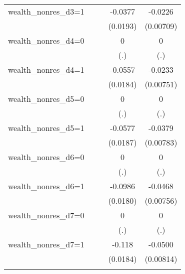 \begin{table}[htbp]
\begin{tabular}{l*{4}{c}}
\addlinespace
wealth\_nonres\_d3=1&                  &                  &  -0.0377\sym{*}  &  -0.0226\sym{***}\\
                &                  &                  & (0.0193)         &(0.00709)         \\
\addlinespace
wealth\_nonres\_d4=0&                  &                  &        0         &        0         \\
                &                  &                  &      (.)         &      (.)         \\
\addlinespace
wealth\_nonres\_d4=1&                  &                  &  -0.0557\sym{***}&  -0.0233\sym{***}\\
                &                  &                  & (0.0184)         &(0.00751)         \\
\addlinespace
wealth\_nonres\_d5=0&                  &                  &        0         &        0         \\
                &                  &                  &      (.)         &      (.)         \\
\addlinespace
wealth\_nonres\_d5=1&                  &                  &  -0.0577\sym{***}&  -0.0379\sym{***}\\
                &                  &                  & (0.0187)         &(0.00783)         \\
\addlinespace
wealth\_nonres\_d6=0&                  &                  &        0         &        0         \\
                &                  &                  &      (.)         &      (.)         \\
\addlinespace
wealth\_nonres\_d6=1&                  &                  &  -0.0986\sym{***}&  -0.0468\sym{***}\\
                &                  &                  & (0.0180)         &(0.00756)         \\
\addlinespace
wealth\_nonres\_d7=0&                  &                  &        0         &        0         \\
                &                  &                  &      (.)         &      (.)         \\
\addlinespace
wealth\_nonres\_d7=1&                  &                  &   -0.118\sym{***}&  -0.0500\sym{***}\\
                &                  &                  & (0.0184)         &(0.00814)         \\
\addlinespace

\end{tabular}
\end{table}
